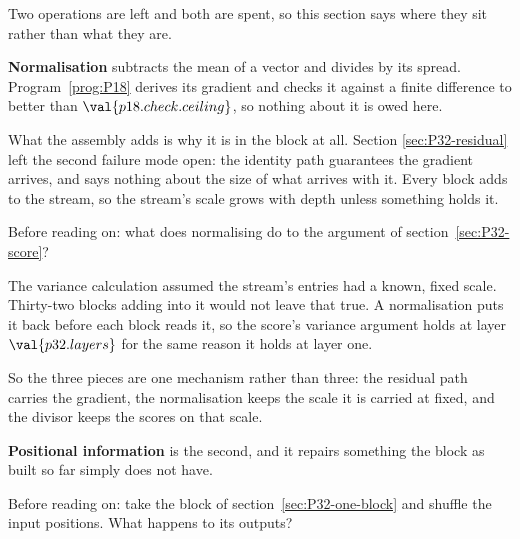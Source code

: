\begin{fr}
Two operations are left and both are spent, so this section says where they
sit rather than what they are.

\textbf{Normalisation} subtracts the mean of a vector and divides by its
spread. Program~\ref{prog:P18} derives its gradient and checks it against a
finite difference to better than $\val{p18.check.ceiling}$, so nothing about
it is owed here.

What the assembly adds is why it is in the block at all. Section
\ref{sec:P32-residual} left the second failure mode open: the identity path
guarantees the gradient arrives, and says nothing about the size of what
arrives with it. Every block adds to the stream, so the stream's scale grows
with depth unless something holds it.

Before reading on: what does normalising do to the argument of
section~\ref{sec:P32-score}?
\dotline
\nextframe
\end{fr}

\begin{fr}

The variance calculation assumed the stream's entries had a known, fixed
scale. Thirty-two blocks adding into it would not leave that true. A
normalisation puts it back before each block reads it, so the score's
variance argument holds at layer $\val{p32.layers}$ for the same reason it
holds at layer one.

So the three pieces are one mechanism rather than three: the residual path
carries the gradient, the normalisation keeps the scale it is carried at
fixed, and the divisor keeps the scores on that scale.

\textbf{Positional information} is the second, and it repairs something
the block as built so far simply does not have.

Before reading on: take the block of section~\ref{sec:P32-one-block} and
shuffle the input positions. What happens to its outputs?
\dotline
\nextframe
\end{fr}

